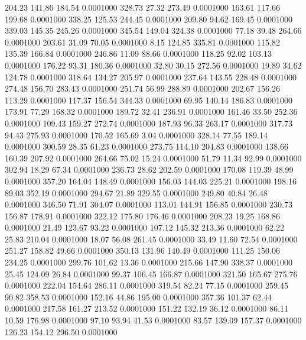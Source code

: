  204.23  141.86  184.54   0.0001000
 328.73   27.32  273.49   0.0001000
 163.61  117.66  199.68   0.0001000
 338.25  125.53  244.45   0.0001000
 209.80   94.62  169.45   0.0001000
 339.03  145.35  245.26   0.0001000
 345.54  149.04  324.38   0.0001000
  77.18   39.48  264.66   0.0001000
 203.61   31.09   70.05   0.0001000
   8.15  124.85  335.81   0.0001000
 115.82  135.39  166.84   0.0001000
 246.86   11.09   88.66   0.0001000
 118.25   92.02  103.13   0.0001000
 176.22   93.31  180.36   0.0001000
  32.80   30.15  272.56   0.0001000
  19.89   34.62  124.78   0.0001000
 318.64  134.27  205.97   0.0001000
 237.64  143.55  228.48   0.0001000
 274.48  156.70  283.43   0.0001000
 251.74   56.99  288.89   0.0001000
 202.67  156.26  113.29   0.0001000
 117.37  156.54  344.33   0.0001000
  69.95  140.14  186.83   0.0001000
 173.91   77.29  168.32   0.0001000
 189.72   32.41  236.91   0.0001000
 161.46   33.50  252.36   0.0001000
 109.43  159.27  272.74   0.0001000
 187.93   96.33  263.17   0.0001000
 317.73   94.43  275.93   0.0001000
 170.52  165.69    3.04   0.0001000
 328.14   77.55  189.14   0.0001000
 300.59   28.35   61.23   0.0001000
 273.75  114.10  204.83   0.0001000
 138.66  160.39  207.92   0.0001000
 264.66   75.02   15.24   0.0001000
  51.79   11.34   92.99   0.0001000
 302.94   18.29   67.34   0.0001000
 236.73   28.62  202.59   0.0001000
 170.08  119.39   48.99   0.0001000
 357.20  164.04  148.49   0.0001000
 156.03  144.03  225.21   0.0001000
 198.16   89.03  352.19   0.0001000
 294.67   21.89  329.55   0.0001000
 249.80   40.84   26.48   0.0001000
 346.50   71.91  304.07   0.0001000
 113.01  144.91  156.85   0.0001000
 230.73  156.87  178.91   0.0001000
 322.12  175.80  176.46   0.0001000
 208.23   19.25  168.86   0.0001000
  21.49  123.67   93.22   0.0001000
 107.12  145.32  213.36   0.0001000
  62.22   25.83  210.04   0.0001000
  18.07   56.08  261.45   0.0001000
  33.49   11.60   72.54   0.0001000
 251.27  158.82   49.66   0.0001000
 350.13  131.96  140.49   0.0001000
 111.25  150.06  234.25   0.0001000
 299.76  101.62   13.36   0.0001000
 215.66  147.90  338.37   0.0001000
  25.45  124.09   26.84   0.0001000
  99.37  106.45  166.87   0.0001000
 321.50  165.67  275.76   0.0001000
 222.04  154.64  286.11   0.0001000
 319.54   82.24   77.15   0.0001000
 259.45   90.82  358.53   0.0001000
 152.16   44.86  195.00   0.0001000
 357.36  101.37   62.44   0.0001000
 217.58  161.27  213.52   0.0001000
 151.22  132.19   36.12   0.0001000
  86.11   10.59  176.98   0.0001000
  97.10   93.94   41.53   0.0001000
  83.57  139.09  157.37   0.0001000
 126.23  154.12  296.50   0.0001000
